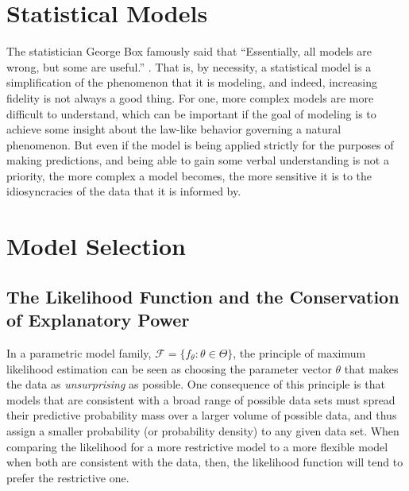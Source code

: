 \section{Statistical Models}

The statistician George Box famously said that 
``Essentially, all models are wrong, but some are useful.''
\citep{box1987empirical}.  
That is, by necessity, a statistical model is a simplification of the phenomenon
that it is modeling, and indeed, increasing fidelity is not always a
good thing.  For one, more complex models are more difficult to
understand, which can be important if the goal of modeling is to
achieve some insight about the law-like behavior governing a natural
phenomenon.  But even if the model is being applied strictly for the
purposes of making predictions, and being able to gain some verbal
understanding is not a priority, the more complex a model becomes, the
more sensitive it is to the idiosyncracies of the data that it is
informed by.

\section{Model Selection}
\label{sec:model-selection}

\subsection{The Likelihood Function and the Conservation of
  Explanatory Power}
\label{sec:bayes-occams-razor}

In a parametric model family, $\mathcal{F} = \{f_{\theta}: \theta \in
\Theta\}$, the principle of maximum likelihood estimation can be seen
as choosing the parameter vector $\theta$ that makes the data as {\em unsurprising} 
as possible.  One consequence of this principle is that models that
are consistent with a broad range of possible data sets must spread
their predictive probability mass over a larger volume of possible
data, and thus assign a smaller probability (or probability density)
to any given data set.  When comparing the likelihood for a more
restrictive model to a more flexible model when both are consistent
with the data, then, the likelihood function will tend to prefer the
restrictive one.

